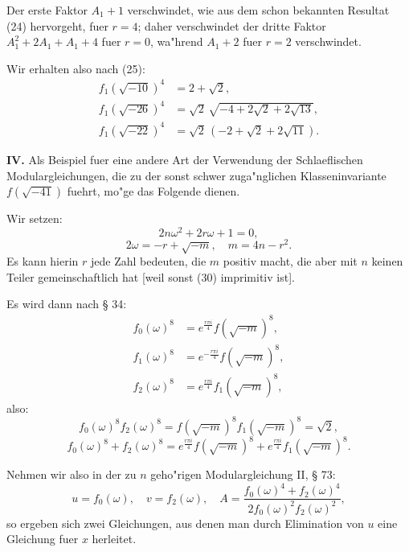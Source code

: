 \documentclass[12pt,a4paper]{article}
\theoremstyle{plain}
\theoremstyle{definition}
\theoremstyle{remark}
\begin{document}
Der erste Faktor $A_1 + 1$ verschwindet, wie aus dem schon bekannten Resultat (24) hervorgeht, fuer $r = 4$; daher verschwindet der dritte Faktor $A_1^2 + 2A_1 + A_1 + 4$ fuer $r = 0$, wa"hrend $A_1 + 2$ fuer $r = 2$ verschwindet.

Wir erhalten also nach (25):
\begin{align}
f_1(\sqrt{-10})^4 &= 2 + \sqrt{2}, \label{eq:130_26}\\
f_1(\sqrt{-26})^4 &= \sqrt{2}\, \sqrt{-4 + 2\sqrt{2} + 2\sqrt{13}}, \label{eq:130_28}\\
f_1(\sqrt{-22})^4 &= \sqrt{2}\, (-2 + \sqrt{2} + 2\sqrt{11}). \label{eq:130_29}
\end{align}

\textbf{IV.} Als Beispiel fuer eine andere Art der Verwendung der Schlaeflischen Modulargleichungen, die zu der sonst schwer zuga"nglichen Klasseninvariante $f(\sqrt{-41})$ fuehrt, mo"ge das Folgende dienen.

Wir setzen:
\begin{equation}\label{eq:130_30}
2n\omega^2 + 2r\omega + 1 = 0,
\end{equation}
\begin{equation}\label{eq:130_31}
2\omega = -r + \sqrt{-m}, \quad m = 4n - r^2.
\end{equation}
Es kann hierin $r$ jede Zahl bedeuten, die $m$ positiv macht, die aber mit $n$ keinen Teiler gemeinschaftlich hat [weil sonst (30) imprimitiv ist].

Es wird dann nach \S{} 34:
\begin{equation}\label{eq:130_32}
\begin{aligned}
f_0(\omega)^8 &= e^{\frac{r\pi i}{4}} f(\sqrt{-m})^8, \\
f_1(\omega)^8 &= e^{-\frac{r\pi i}{4}} f(\sqrt{-m})^8, \\
f_2(\omega)^8 &= e^{\frac{r\pi i}{4}} f_1(\sqrt{-m})^8,
\end{aligned}
\end{equation}
also:
\[
f_0(\omega)^8 f_2(\omega)^8 = f(\sqrt{-m})^8 f_1(\sqrt{-m})^8 = \sqrt{2},
\]
\begin{equation}\label{eq:130_33}
f_0(\omega)^8 + f_2(\omega)^8 = e^{\frac{r\pi i}{4}} f(\sqrt{-m})^8 + e^{\frac{r\pi i}{4}} f_1(\sqrt{-m})^8.
\end{equation}

Nehmen wir also in der zu $n$ geho"rigen Modulargleichung II, \S{} 73:
\[
u = f_0(\omega), \quad v = f_2(\omega), \quad A = \frac{f_0(\omega)^4 + f_2(\omega)^4}{2f_0(\omega)^2 f_2(\omega)^2},
\]
so ergeben sich zwei Gleichungen, aus denen man durch Elimination von $u$ eine Gleichung fuer $x$ herleitet.
\end{document}
